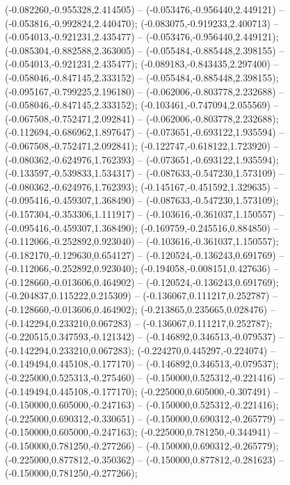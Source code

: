  (-0.082260,-0.955328,2.414505) -- (-0.053476,-0.956440,2.449121) -- (-0.053816,-0.992824,2.440470);
 (-0.083075,-0.919233,2.400713) -- (-0.054013,-0.921231,2.435477) -- (-0.053476,-0.956440,2.449121);
 (-0.085304,-0.882588,2.363005) -- (-0.055484,-0.885448,2.398155) -- (-0.054013,-0.921231,2.435477);
 (-0.089183,-0.843435,2.297400) -- (-0.058046,-0.847145,2.333152) -- (-0.055484,-0.885448,2.398155);
 (-0.095167,-0.799225,2.196180) -- (-0.062006,-0.803778,2.232688) -- (-0.058046,-0.847145,2.333152);
 (-0.103461,-0.747094,2.055569) -- (-0.067508,-0.752471,2.092841) -- (-0.062006,-0.803778,2.232688);
 (-0.112694,-0.686962,1.897647) -- (-0.073651,-0.693122,1.935594) -- (-0.067508,-0.752471,2.092841);
 (-0.122747,-0.618122,1.723920) -- (-0.080362,-0.624976,1.762393) -- (-0.073651,-0.693122,1.935594);
 (-0.133597,-0.539833,1.534317) -- (-0.087633,-0.547230,1.573109) -- (-0.080362,-0.624976,1.762393);
 (-0.145167,-0.451592,1.329635) -- (-0.095416,-0.459307,1.368490) -- (-0.087633,-0.547230,1.573109);
 (-0.157304,-0.353306,1.111917) -- (-0.103616,-0.361037,1.150557) -- (-0.095416,-0.459307,1.368490);
 (-0.169759,-0.245516,0.884850) -- (-0.112066,-0.252892,0.923040) -- (-0.103616,-0.361037,1.150557);
 (-0.182170,-0.129630,0.654127) -- (-0.120524,-0.136243,0.691769) -- (-0.112066,-0.252892,0.923040);
 (-0.194058,-0.008151,0.427636) -- (-0.128660,-0.013606,0.464902) -- (-0.120524,-0.136243,0.691769);
 (-0.204837,0.115222,0.215309) -- (-0.136067,0.111217,0.252787) -- (-0.128660,-0.013606,0.464902);
 (-0.213865,0.235665,0.028476) -- (-0.142294,0.233210,0.067283) -- (-0.136067,0.111217,0.252787);
 (-0.220515,0.347593,-0.121342) -- (-0.146892,0.346513,-0.079537) -- (-0.142294,0.233210,0.067283);
 (-0.224270,0.445297,-0.224074) -- (-0.149494,0.445108,-0.177170) -- (-0.146892,0.346513,-0.079537);
 (-0.225000,0.525313,-0.275460) -- (-0.150000,0.525312,-0.221416) -- (-0.149494,0.445108,-0.177170);
 (-0.225000,0.605000,-0.307491) -- (-0.150000,0.605000,-0.247163) -- (-0.150000,0.525312,-0.221416);
 (-0.225000,0.690312,-0.330651) -- (-0.150000,0.690312,-0.265779) -- (-0.150000,0.605000,-0.247163);
 (-0.225000,0.781250,-0.344941) -- (-0.150000,0.781250,-0.277266) -- (-0.150000,0.690312,-0.265779);
 (-0.225000,0.877812,-0.350362) -- (-0.150000,0.877812,-0.281623) -- (-0.150000,0.781250,-0.277266);
